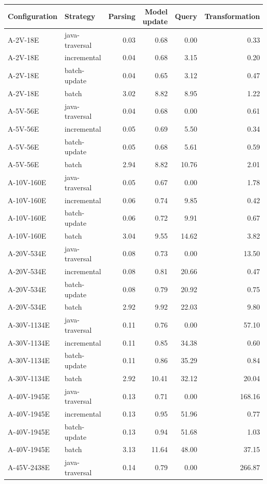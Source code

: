 \begin{tabular}{@{}llrrrr@{}}
\toprule
Configuration & Strategy & Parsing & Model update & Query & Transformation \\
\midrule
A-2V-18E & java-traversal & 0.03 & 0.68 & 0.00 & 0.33 \\
A-2V-18E & incremental & 0.04 & 0.68 & 3.15 & 0.20 \\
A-2V-18E & batch-update & 0.04 & 0.65 & 3.12 & 0.47 \\
A-2V-18E & batch & 3.02 & 8.82 & 8.95 & 1.22 \\
A-5V-56E & java-traversal & 0.04 & 0.68 & 0.00 & 0.61 \\
A-5V-56E & incremental & 0.05 & 0.69 & 5.50 & 0.34 \\
A-5V-56E & batch-update & 0.05 & 0.68 & 5.61 & 0.59 \\
A-5V-56E & batch & 2.94 & 8.82 & 10.76 & 2.01 \\
A-10V-160E & java-traversal & 0.05 & 0.67 & 0.00 & 1.78 \\
A-10V-160E & incremental & 0.06 & 0.74 & 9.85 & 0.42 \\
A-10V-160E & batch-update & 0.06 & 0.72 & 9.91 & 0.67 \\
A-10V-160E & batch & 3.04 & 9.55 & 14.62 & 3.82 \\
A-20V-534E & java-traversal & 0.08 & 0.73 & 0.00 & 13.50 \\
A-20V-534E & incremental & 0.08 & 0.81 & 20.66 & 0.47 \\
A-20V-534E & batch-update & 0.08 & 0.79 & 20.92 & 0.75 \\
A-20V-534E & batch & 2.92 & 9.92 & 22.03 & 9.80 \\
A-30V-1134E & java-traversal & 0.11 & 0.76 & 0.00 & 57.10 \\
A-30V-1134E & incremental & 0.11 & 0.85 & 34.38 & 0.60 \\
A-30V-1134E & batch-update & 0.11 & 0.86 & 35.29 & 0.84 \\
A-30V-1134E & batch & 2.92 & 10.41 & 32.12 & 20.04 \\
A-40V-1945E & java-traversal & 0.13 & 0.71 & 0.00 & 168.16 \\
A-40V-1945E & incremental & 0.13 & 0.95 & 51.96 & 0.77 \\
A-40V-1945E & batch-update & 0.13 & 0.94 & 51.68 & 1.03 \\
A-40V-1945E & batch & 3.13 & 11.64 & 48.00 & 37.15 \\
A-45V-2438E & java-traversal & 0.14 & 0.79 & 0.00 & 266.87 \\

\end{tabular}
